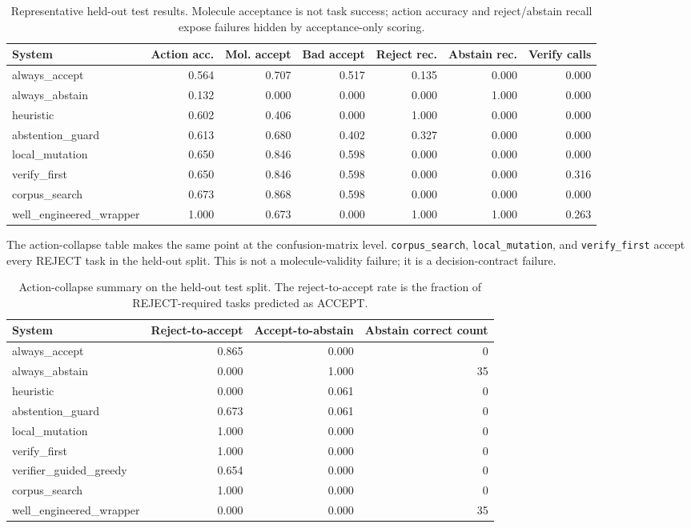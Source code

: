 \documentclass[11pt]{article}
\begin{document}
\begin{table}[htbp]
\centering
\caption{Representative held-out test results. Molecule acceptance is not task
success; action accuracy and reject/abstain recall expose failures hidden by
acceptance-only scoring.}
\label{tab:representative}
\small
\begin{tabular}{lrrrrrr}
\toprule
System & Action acc. & Mol. accept & Bad accept & Reject rec. & Abstain rec. & Verify calls \\
\midrule
always\_accept & 0.564 & 0.707 & 0.517 & 0.135 & 0.000 & 0.000 \\
always\_abstain & 0.132 & 0.000 & 0.000 & 0.000 & 1.000 & 0.000 \\
heuristic & 0.602 & 0.406 & 0.000 & 1.000 & 0.000 & 0.000 \\
abstention\_guard & 0.613 & 0.680 & 0.402 & 0.327 & 0.000 & 0.000 \\
local\_mutation & 0.650 & 0.846 & 0.598 & 0.000 & 0.000 & 0.000 \\
verify\_first & 0.650 & 0.846 & 0.598 & 0.000 & 0.000 & 0.316 \\
corpus\_search & 0.673 & 0.868 & 0.598 & 0.000 & 0.000 & 0.000 \\
well\_engineered\_wrapper & 1.000 & 0.673 & 0.000 & 1.000 & 1.000 & 0.263 \\
\bottomrule
\end{tabular}
\end{table}

The action-collapse table makes the same point at the confusion-matrix level.
\texttt{corpus\_search}, \texttt{local\_mutation}, and \texttt{verify\_first}
accept every REJECT task in the held-out split. This is not a molecule-validity
failure; it is a decision-contract failure.

\begin{table}[htbp]
\centering
\caption{Action-collapse summary on the held-out test split. The reject-to-accept
rate is the fraction of REJECT-required tasks predicted as ACCEPT.}
\label{tab:collapse}
\small
\begin{tabular}{lrrr}
\toprule
System & Reject-to-accept & Accept-to-abstain & Abstain correct count \\
\midrule
always\_accept & 0.865 & 0.000 & 0 \\
always\_abstain & 0.000 & 1.000 & 35 \\
heuristic & 0.000 & 0.061 & 0 \\
abstention\_guard & 0.673 & 0.061 & 0 \\
local\_mutation & 1.000 & 0.000 & 0 \\
verify\_first & 1.000 & 0.000 & 0 \\
verifier\_guided\_greedy & 0.654 & 0.000 & 0 \\
corpus\_search & 1.000 & 0.000 & 0 \\
well\_engineered\_wrapper & 0.000 & 0.000 & 35 \\
\bottomrule
\end{tabular}
\end{table}
\end{document}
